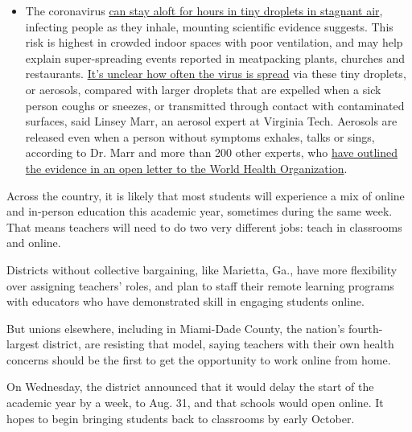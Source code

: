 \begin{itemize}
  \begin{itemize}
  \tightlist
  \item
    The coronavirus
    \href{https://www.nytimes3xbfgragh.onion/2020/07/04/health/239-experts-with-one-big-claim-the-coronavirus-is-airborne.html?action=click\&pgtype=Article\&state=default\&region=MAIN_CONTENT_3\&context=storylines_faq}{can
    stay aloft for hours in tiny droplets in stagnant air}, infecting
    people as they inhale, mounting scientific evidence suggests. This
    risk is highest in crowded indoor spaces with poor ventilation, and
    may help explain super-spreading events reported in meatpacking
    plants, churches and restaurants.
    \href{https://www.nytimes3xbfgragh.onion/2020/07/06/health/coronavirus-airborne-aerosols.html?action=click\&pgtype=Article\&state=default\&region=MAIN_CONTENT_3\&context=storylines_faq}{It's
    unclear how often the virus is spread} via these tiny droplets, or
    aerosols, compared with larger droplets that are expelled when a
    sick person coughs or sneezes, or transmitted through contact with
    contaminated surfaces, said Linsey Marr, an aerosol expert at
    Virginia Tech. Aerosols are released even when a person without
    symptoms exhales, talks or sings, according to Dr. Marr and more
    than 200 other experts, who
    \href{https://academic.oup.com/cid/article/doi/10.1093/cid/ciaa939/5867798}{have
    outlined the evidence in an open letter to the World Health
    Organization}.
  \end{itemize}
\end{itemize}

Across the country, it is likely that most students will experience a
mix of online and in-person education this academic year, sometimes
during the same week. That means teachers will need to do two very
different jobs: teach in classrooms and online.

Districts without collective bargaining, like Marietta, Ga., have more
flexibility over assigning teachers' roles, and plan to staff their
remote learning programs with educators who have demonstrated skill in
engaging students online.

But unions elsewhere, including in Miami-Dade County, the nation's
fourth-largest district, are resisting that model, saying teachers with
their own health concerns should be the first to get the opportunity to
work online from home.

On Wednesday, the district announced that it would delay the start of
the academic year by a week, to Aug. 31, and that schools would open
online. It hopes to begin bringing students back to classrooms by early
October.

